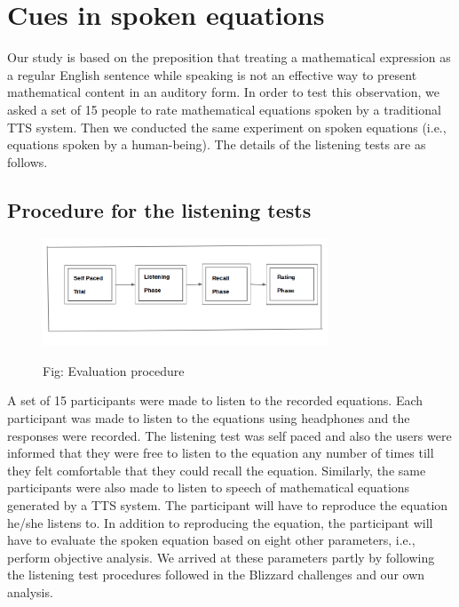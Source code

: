 \documentclass{article}
\begin{document}
\section{Cues in spoken equations}
\label{sec:cues}


Our study is based on the preposition that treating a mathematical expression as a regular English sentence while speaking is not an effective way to present mathematical content in an auditory form. In order to test this observation, we asked a set of 15 people to rate mathematical equations spoken by a traditional TTS system.  Then we conducted the same experiment on spoken equations (i.e., equations spoken by a human-being). The details of the listening tests are as follows.




\subsection{Procedure for the listening tests}
\begin{figure}[h]
\label{fig:eval}

\begin{minipage}[b]{1.0\linewidth}
  \centering
  
  \centerline{\includegraphics[width=8.5cm]{eval}}
 
  \centerline{Fig: Evaluation procedure}\medskip
\end{minipage}
\end{figure}

A set of 15 participants were made to listen to the recorded equations. Each participant was made to listen to the equations using headphones and the responses were recorded. The listening test was self paced and also the users were informed that they were free to listen to the equation any number of times till they felt comfortable that they could recall the equation.  Similarly, the same participants were also made to listen to speech of mathematical equations generated by a TTS system. The participant will have to reproduce the equation he/she listens to. In addition to reproducing the equation, the participant will have to evaluate the spoken equation based on eight other parameters, i.e., perform objective analysis. We arrived at these parameters partly by following the listening test procedures followed in the Blizzard challenges \cite{hinterleitner2011evaluation} and our own analysis.
\end{document}
